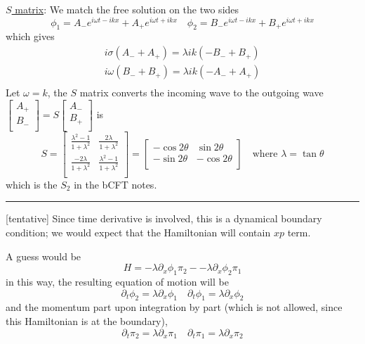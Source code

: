 \documentclass{article}
\begin{document}
\underline{$S$ matrix}: We match the free solution on the two sides
\begin{equation}
\phi_1 = A_{-} e^{i \omega t - i k x } + A_{+} e^{i \omega t + ikx } \quad \phi_2 = B_{-} e^{i \omega t - i k x } + B_{+} e^{i \omega t + ikx }
\end{equation}
which gives
\begin{equation}
\begin{aligned}
i \sigma( A_{-} + A_{+} )  =\lambda  ik (  - B_{-} +  B_{+} ) \\
i\omega( B_{-} + B_{+} ) = \lambda  ik( - A_{-} + A_{+}) \\
\end{aligned}
\end{equation}
Let $\omega = k$, the $S$ matrix converts the incoming wave to the outgoing wave $\begin{bmatrix} A_{+}\\ B_{-}\\ \end{bmatrix} = S \begin{bmatrix} A_{-}\\ B_{+}\\ \end{bmatrix}$  is 
\begin{equation}
S = 
\begin{bmatrix}
\frac{\lambda^2 - 1}{1 + \lambda^2} & \frac{2\lambda }{1 + \lambda^2} \\
\frac{-2\lambda }{1 + \lambda^2} & \frac{\lambda^2 - 1}{1 + \lambda^2} \\
\end{bmatrix}
 = 
\begin{bmatrix}
-\cos 2\theta & \sin 2\theta \\
-\sin 2\theta & - \cos2  \theta \\
\end{bmatrix}
\quad \text{where } \lambda = \tan \theta 
\end{equation}
which is the $S_2$ in the bCFT notes. \\
\noindent\rule{\linewidth}{0.4pt}

[tentative]
Since time derivative is involved, this is a dynamical boundary condition; we would expect that the Hamiltonian will contain $xp$ term. 

A guess would be
\begin{equation}
H = - \lambda \partial_x \phi_1 \pi_2 - - \lambda \partial_x \phi_2 \pi_1
\end{equation}
in this way, the resulting equation of motion will be
\begin{equation}
\partial_t \phi_2  = \lambda \partial_x \phi_1 \quad \partial_t \phi_1  = \lambda \partial_x \phi_2
\end{equation}
and the momentum part upon integration by part (which is not allowed, since this Hamiltonian is at the boundary), 
\begin{equation}
\partial_t \pi_2  = \lambda \partial_x \pi_1 \quad \partial_t \pi_1  = \lambda \partial_x \pi_2
\end{equation}




\end{document}
